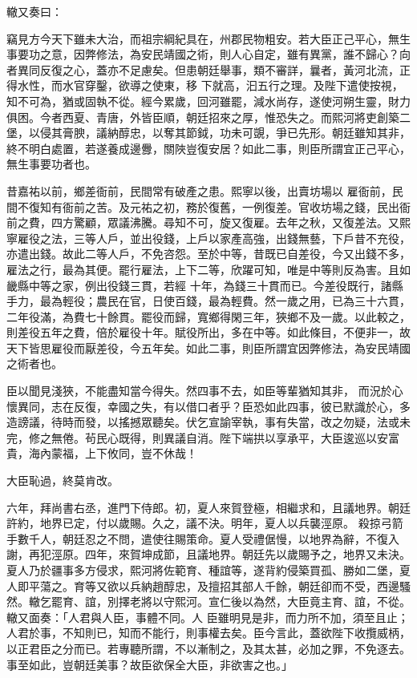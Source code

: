 \begin{pinyinscope}
 轍又奏曰：



 竊見方今天下雖未大治，而祖宗綱紀具在，州郡民物粗安。若大臣正己平心，無生事要功之意，因弊修法，為安民靖國之術，則人心自定，雖有異黨，誰不歸心？向者異同反復之心，蓋亦不足慮矣。但患朝廷舉事，類不審詳，曩者，黃河北流，正得水性，而水官穿鑿，欲導之使東，移
 下就高，汩五行之理。及陛下遣使按視，知不可為，猶或固執不從。經今累歲，回河雖罷，減水尚存，遂使河朔生靈，財力俱困。今者西夏、青唐，外皆臣順，朝廷招來之厚，惟恐失之。而熙河將吏創築二堡，以侵其膏腴，議納醇忠，以奪其節鉞，功未可覬，爭已先形。朝廷雖知其非，終不明白處置，若遂養成邊釁，關陜豈復安居？如此二事，則臣所謂宜正己平心，無生事要功者也。



 昔嘉祐以前，鄉差衙前，民間常有破產之患。熙寧以後，出賣坊場以
 雇衙前，民間不復知有衙前之苦。及元祐之初，務於復舊，一例復差。官收坊場之錢，民出衙前之費，四方驚顧，眾議沸騰。尋知不可，旋又復雇。去年之秋，又復差法。又熙寧雇役之法，三等人戶，並出役錢，上戶以家產高強，出錢無藝，下戶昔不充役，亦遣出錢。故此二等人戶，不免咨怨。至於中等，昔既已自差役，今又出錢不多，雇法之行，最為其便。罷行雇法，上下二等，欣躍可知，唯是中等則反為害。且如畿縣中等之家，例出役錢三貫，若經
 十年，為錢三十貫而已。今差役既行，諸縣手力，最為輕役；農民在官，日使百錢，最為輕費。然一歲之用，已為三十六貫，二年役滿，為費七十餘貫。罷役而歸，寬鄉得閑三年，狹鄉不及一歲。以此較之，則差役五年之費，倍於雇役十年。賦役所出，多在中等。如此條目，不便非一，故天下皆思雇役而厭差役，今五年矣。如此二事，則臣所謂宜因弊修法，為安民靖國之術者也。



 臣以聞見淺狹，不能盡知當今得失。然四事不去，如臣等輩猶知其非，
 而況於心懷異同，志在反復，幸國之失，有以借口者乎？臣恐如此四事，彼已默識於心，多造謗議，待時而發，以搖撼眾聽矣。伏乞宣諭宰執，事有失當，改之勿疑，法或未完，修之無倦。茍民心既得，則異議自消。陛下端拱以享承平，大臣逡巡以安富貴，海內蒙福，上下攸同，豈不休哉！



 大臣恥過，終莫肯改。



 六年，拜尚書右丞，進門下侍郎。初，夏人來賀登極，相繼求和，且議地界。朝廷許約，地界已定，付以歲賜。久之，議不決。明年，夏人以兵襲涇原。
 殺掠弓箭手數千人，朝廷忍之不問，遣使往賜策命。夏人受禮倨慢，以地界為辭，不復入謝，再犯涇原。四年，來賀坤成節，且議地界。朝廷先以歲賜予之，地界又未決。夏人乃於疆事多方侵求，熙河將佐範育、種誼等，遂背約侵築買孤、勝如二堡，夏人即平蕩之。育等又欲以兵納趙醇忠，及擅招其部人千餘，朝廷卻而不受，西邊騷然。轍乞罷育、誼，別擇老將以守熙河。宣仁後以為然，大臣竟主育、誼，不從。轍又面奏：「人君與人臣，事體不同。人
 臣雖明見是非，而力所不加，須至且止；人君於事，不知則已，知而不能行，則事權去矣。臣今言此，蓋欲陛下收攬威柄，以正君臣之分而已。若專聽所謂，不以漸制之，及其太甚，必加之罪，不免逐去。事至如此，豈朝廷美事？故臣欲保全大臣，非欲害之也。」




\end{pinyinscope}

